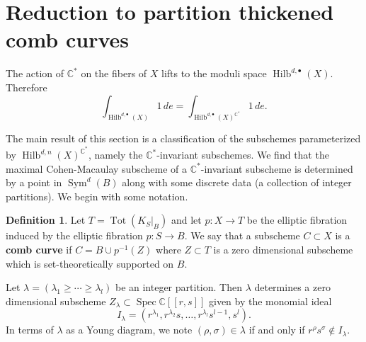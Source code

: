 \documentclass[12pt]{amsart}
\theoremstyle{definition}
\newtheorem{definition}[theorem]{Definition}
\newcommand{\CC} {\mathbb{C}}          %
\newcommand{\Sym}{\operatorname{Sym}}
\newcommand{\Hilb}{\operatorname{Hilb}}
\newcommand{\Tot}{\operatorname{Tot}}
\newcommand{\Spec}{\operatorname{Spec}}
\newcommand{\presectionspace}{\vspace{0.2cm}} %
\begin{document}
\presectionspace
\section{Reduction to partition thickened comb curves}\label{sec: reduction to thickened comb curves}

The action of $\CC^*$ on the fibers of $X$ lifts to the moduli space
$\Hilb^{d,\bullet}(X)$. Therefore
$$
\int_{\Hilb^{d,\bullet}(X)} 1 \, de = \int_{\Hilb^{d,\bullet}(X)^{\CC^*}} 1 \, de.
$$

The main result of this section is a classification of the subschemes
parameterized by $\Hilb^{d,n}(X)^{\CC^{*}}$, namely the
$\CC^{*}$-invariant subschemes.  We find that the maximal
Cohen-Macaulay subscheme of a $\CC^{*}$-invariant subscheme is
determined by a point in $\Sym^{d}(B)$ along with some discrete data
(a collection of integer partitions). We begin with some notation.




\begin{definition}\label{defn: comb curves} 
Let $T=\Tot(K_{S}|_{B})$ and let $p:X\to T$ be the elliptic fibration
induced by the elliptic fibration $p:S\to B$. We say that a subscheme $C\subset
X$ is a \textbf{comb curve} if $C=B\cup p^{-1}(Z) $ where $Z\subset T$
is a zero dimensional subscheme which is set-theoretically supported on
$B$.
\end{definition}

Let $\lambda =(\lambda_{1}\geq \dotsb \geq \lambda_{l}) $ be an
integer partition. Then $\lambda$ determines a zero dimensional subscheme
$Z_{\lambda}\subset \Spec \CC [[r,s]]$ given by the monomial ideal
\begin{equation}\label{eqn: monomial ideal I given by a partition lambda}
I_{\lambda}=(r^{\lambda_{1}},r^{\lambda_{2}}s,\dotsc
,r^{\lambda_{l}}s^{l-1},s^{l}).
\end{equation}
In terms of $\lambda$ as a Young diagram, we note $(\rho ,\sigma)\in
\lambda$ if and only if $r^{\rho}s^{\sigma}\notin I_{\lambda}.$
\end{document}
